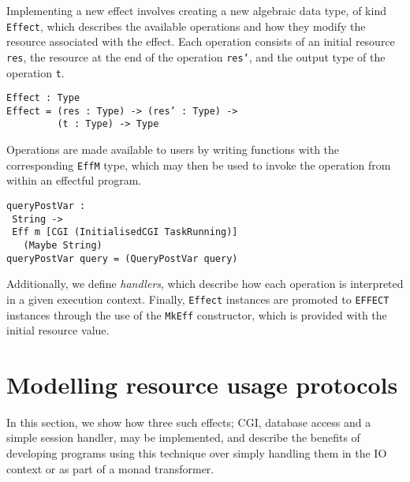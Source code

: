 \documentclass[preprint]{sigplanconf}
\begin{document}
Implementing a new effect involves creating a new algebraic data type, of kind \texttt{Effect}, which describes the available operations and how they modify the resource associated with the effect. Each operation consists of an initial resource \texttt{res}, the resource at the end of the operation \texttt{res'}, and the output type of the operation \texttt{t}.
\begin{Verbatim}
Effect : Type
Effect = (res : Type) -> (res’ : Type) ->
         (t : Type) -> Type
\end{Verbatim}
Operations are made available to users by writing functions with the corresponding \texttt{EffM} type, which may then be used to invoke the operation from within an effectful program.
\begin{Verbatim}
queryPostVar : 
 String -> 
 Eff m [CGI (InitialisedCGI TaskRunning)] 
   (Maybe String)
queryPostVar query = (QueryPostVar query)
\end{Verbatim}
Additionally, we define \textit{handlers}, which describe how each operation is interpreted in a given execution context. Finally, \texttt{Effect} instances are promoted to \texttt{EFFECT} instances through the use of the \texttt{MkEff} constructor, which is provided with the initial resource value.


\section{Modelling resource usage protocols}
\label{rup}
In this section, we show how three such effects; CGI, database access and a simple session handler, may be implemented, and describe the benefits of developing programs using this technique over simply handling them in the IO context or as part of a monad transformer.

\end{document}
